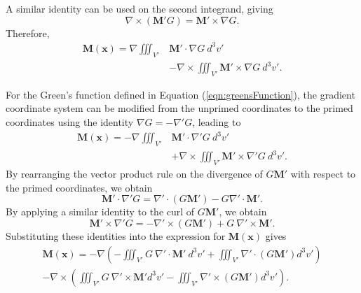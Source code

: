 A similar identity can be used on the second integrand, giving
\begin{equation}
    \nabla \times \left( \mathbf{M}' G\right) = \mathbf{M}' \times \nabla G \text{.}
\end{equation}
Therefore,
\begin{align}
    \mathbf{M}\left(\mathbf{x}\right) = \nabla \iiint_{V'} & \mathbf{M}' \cdot \nabla G \ d^3v' \nonumber \\
    & - \nabla \times \iiint_{V'} \mathbf{M}' \times \nabla G\ d^3v' \text{.}
\end{align}

For the Green's function defined in Equation (\ref{eqn:greensFunction}), the gradient coordinate system can be modified from the unprimed coordinates to the primed coordinates using the identity \(\nabla G = -\nabla' G\), leading to
\begin{align}
    \mathbf{M}\left(\mathbf{x}\right) = -\nabla \iiint_{V'} & \mathbf{M}' \cdot \nabla' G \ d^3v' \nonumber \\
    & + \nabla \times \iiint_{V'} \mathbf{M}' \times \nabla' G\ d^3v' \text{.}
\end{align}
By rearranging the vector product rule on the divergence of \(G\mathbf{M}'\) with respect to the primed coordinates, we obtain
\begin{equation}
    \mathbf{M}' \cdot \nabla' G = \nabla' \cdot \left(G\mathbf{M}'\right) - G \nabla' \cdot \mathbf{M}' \text{.}
\end{equation}
By applying a similar identity to the curl of \(G\mathbf{M}'\), we obtain
\begin{equation}
    \mathbf{M}' \times \nabla' G = -\nabla' \times \left( G\mathbf{M}' \right) + G\ \nabla' \times \mathbf{M}' \text{.}
\end{equation}
Substituting these identities into the expression for \(\mathbf{M}\left(\mathbf{x}\right)\) gives
\begin{align}\label{eqn:chargeModelM_fourIntegrals}
    \mathbf{M}\left(\mathbf{x}\right) = -\nabla \left( -\iiint_{V'} G\ \nabla' \cdot \mathbf{M}'\ d^3v' + \iiint_{V'} \nabla' \cdot \left(G\mathbf{M}'\right) d^3v' \right) \nonumber \\
    -\nabla \times \left( \iiint_{V'} G\ \nabla' \times \mathbf{M}' d^3v' - \iiint_{V'} \nabla' \times \left( G\mathbf{M}'\right) d^3v' \right) \text{.}
\end{align}

